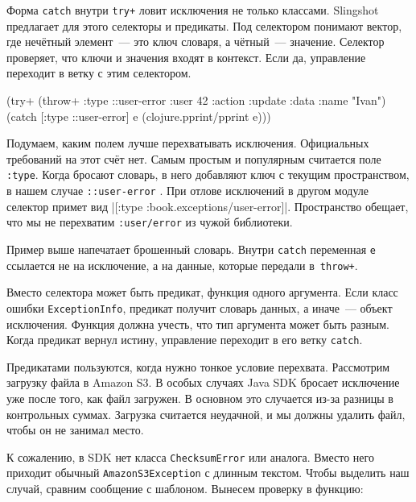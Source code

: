 
Форма \verb|catch| внутри \verb|try+| ловит исключения не только
классами. Slingshot предлагает для этого селекторы и предикаты. Под селектором
понимают вектор, где нечётный элемент~--- это ключ словаря, а чётный~---
значение. Селектор проверяет, что ключи и значения входят в контекст. Если да,
управление переходит в ветку с этим селектором.

\begin{english}
  \begin{clojure/lines}
(try+
 (throw+ {:type ::user-error
          :user 42
          :action :update
          :data {:name "Ivan"}})
 (catch [:type ::user-error] e
   (clojure.pprint/pprint e)))
  \end{clojure/lines}
\end{english}

Подумаем, каким полем лучше перехватывать исключения. Официальных требований на
этот счёт нет. Самым простым и популярным считается поле \verb|:type|. Когда
бросают словарь, в него добавляют ключ с текущим пространством, в нашем случае
\verb|::user-error| . При отлове исключений в другом модуле селектор
примет вид \spverb|[:type :book.exceptions/user-error]|. Пространство обещает,
что мы не перехватим \texttt{:user\-/error} из чужой библиотеки.

Пример выше напечатает брошенный словарь. Внутри \verb|catch| переменная
\verb|e| ссылается не на исключение, а на данные, которые передали
в~\verb|throw+|.

Вместо селектора может быть предикат, функция одного аргумента. Если класс
ошибки \texttt{Excep\-tion\-Info}, предикат получит словарь данных, а иначе~--- объект
исключения. Функция должна учесть, что тип аргумента может быть разным. Когда
предикат вернул истину, управление переходит в его ветку \verb|catch|.


Предикатами пользуются, когда нужно тонкое условие перехвата. Рассмотрим
загрузку файла в Amazon S3. В особых случаях Java SDK бросает исключение уже
после того, как файл загружен. В основном это случается из-за разницы в
контрольных суммах. Загрузка считается неудачной, и мы должны удалить файл,
чтобы он не занимал место.

К сожалению, в SDK нет класса \texttt{Check\-sum\-Er\-ror} или аналога. Вместо него
приходит обычный \texttt{Ama\-zon\-S3\-Excep\-tion} с длинным текстом. Чтобы выделить
наш случай, сравним сообщение с шаблоном. Вынесем проверку в функцию:

